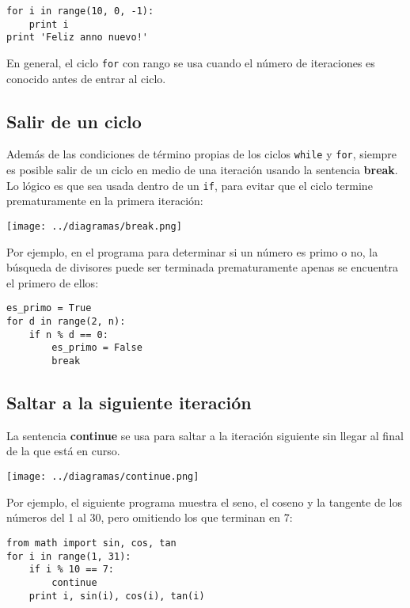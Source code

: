 \begin{lstlisting}
for i in range(10, 0, -1):
    print i
print 'Feliz anno nuevo!'
\end{lstlisting}

En general, el ciclo \lstinline!for! con rango se usa cuando el número
de iteraciones es conocido antes de entrar al ciclo.

\subsection{Salir de un ciclo}

Además de las condiciones de término propias de los ciclos
\lstinline!while! y \lstinline!for!, siempre es posible salir de un
ciclo en medio de una iteración usando la sentencia \textbf{break}. Lo
lógico es que sea usada dentro de un \lstinline!if!, para evitar que el
ciclo termine prematuramente en la primera iteración:

\texttt{[image: ../diagramas/break.png]}

Por ejemplo, en el programa para determinar si un número es primo o no,
la búsqueda de divisores puede ser terminada prematuramente apenas se
encuentra el primero de ellos:

\begin{lstlisting}
es_primo = True
for d in range(2, n):
    if n % d == 0:
        es_primo = False
        break
\end{lstlisting}

\subsection{Saltar a la siguiente iteración}

La sentencia \textbf{continue} se usa para saltar a la iteración
siguiente sin llegar al final de la que está en curso.

\texttt{[image: ../diagramas/continue.png]}

Por ejemplo, el siguiente programa muestra el seno, el coseno y la
tangente de los números del 1 al 30, pero omitiendo los que terminan en
7:

\begin{lstlisting}
from math import sin, cos, tan
for i in range(1, 31):
    if i % 10 == 7:
        continue
    print i, sin(i), cos(i), tan(i)
\end{lstlisting}

